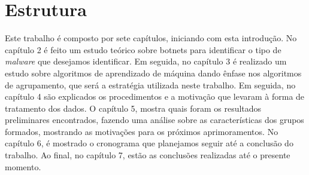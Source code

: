 \section{Estrutura}
Este trabalho é composto por sete capítulos, iniciando com esta introdução. No capítulo 2 é feito um estudo teórico sobre botnets para identificar o tipo de \textit{malware} que desejamos identificar. Em seguida, no capítulo 3 é realizado um estudo sobre algoritmos de aprendizado de máquina dando ênfase nos algoritmos de agrupamento, que será a estratégia utilizada neste trabalho. Em seguida, no capítulo 4 são explicados os procedimentos e a motivação que levaram à forma de tratamento dos dados. O capítulo 5, mostra quais foram os resultados preliminares encontrados, fazendo uma análise sobre as características dos grupos formados, mostrando as motivações para os próximos aprimoramentos. No capítulo 6, é mostrado o cronograma que planejamos seguir até a conclusão do trabalho. Ao final, no capítulo 7, estão as conclusões realizadas até o presente momento.